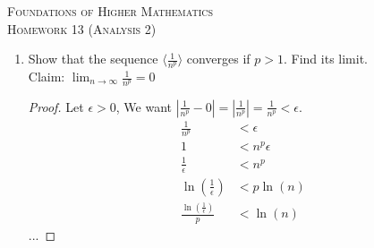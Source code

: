 \documentclass{article}
\theoremstyle{problem}
\theoremstyle{plain}
\theoremstyle{remark}
\newcommand{\abs}[1] {
  \left| #1 \right|
}
\newcommand{\myln}[1] {
  \ln{\left( #1 \right)}
}
\begin{document}
\begin{center}
  \textsc{\Large Foundations of Higher Mathematics}\\[.3cm]
  \textsc{\Large Homework 13 (Analysis 2)}
\end{center}

\begin{enumerate}
\item Show that the sequence $\langle \frac{1}{n^p} \rangle$ converges if $p > 1$. Find its limit.\\  
  Claim: $\displaystyle \lim_{n \to \infty} \frac{1}{n^p} = 0$
  \begin{proof}
    Let $\epsilon > 0$,
    We want $\abs{\frac{1}{n^p} - 0} = \abs{\frac{1}{n^p}} = \frac{1}{n^p} < \epsilon$.
    \begin{align*}
      \frac{1}{n^p} &< \epsilon\\
      1 &< n^p \epsilon\\
      \frac{1}{\epsilon} &< n^p\\
      \myln{\frac{1}{\epsilon}} &< p \myln{n}\\
      \frac{\myln{\frac{1}{\epsilon}}}{p} &< \myln{n}
    \end{align*}
    ...

  \end{proof}


\end{enumerate}
\end{document}
